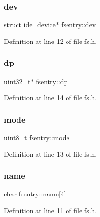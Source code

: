 \subsubsection{\texorpdfstring{dev}{dev}}
{\footnotesize\ttfamily struct \hyperlink{a00212}{ide\+\_\+device}$\ast$ fsentry\+::dev}



Definition at line 12 of file fs.\+h.

\mbox{\label{a00260_ae1d22893563b8753e29fef01f0782ba5_ae1d22893563b8753e29fef01f0782ba5}} 
\subsubsection{\texorpdfstring{dp}{dp}}
{\footnotesize\ttfamily \hyperlink{a00134_a435d1572bf3f880d55459d9805097f62_a435d1572bf3f880d55459d9805097f62}{uint32\+\_\+t}$\ast$ fsentry\+::dp}



Definition at line 14 of file fs.\+h.

\mbox{\label{a00260_a6e71712bc3c51c21dc3362334937e4d7_a6e71712bc3c51c21dc3362334937e4d7}} 
\subsubsection{\texorpdfstring{mode}{mode}}
{\footnotesize\ttfamily \hyperlink{a00134_aba7bc1797add20fe3efdf37ced1182c5_aba7bc1797add20fe3efdf37ced1182c5}{uint8\+\_\+t} fsentry\+::mode}



Definition at line 13 of file fs.\+h.

\mbox{\label{a00260_a9c5a4f5b02eb2c9e9e797f79dc99028a_a9c5a4f5b02eb2c9e9e797f79dc99028a}} 
\subsubsection{\texorpdfstring{name}{name}}
{\footnotesize\ttfamily char fsentry\+::name\mbox{[}4\mbox{]}}



Definition at line 11 of file fs.\+h.

